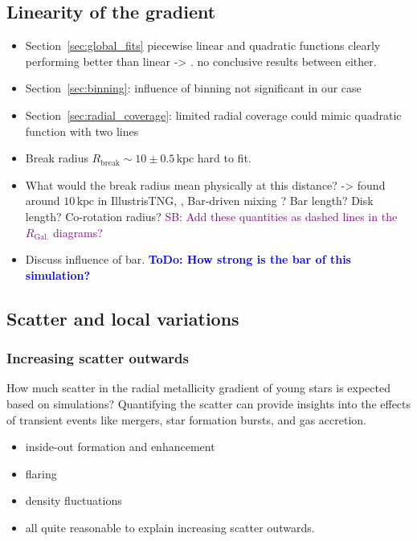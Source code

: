 \documentclass[fleqn,usenatbib]{mnras}
\newcommand{\ToDo}[1]{\textbf{\textcolor{blue}{ToDo: #1}}}
\newcommand{\SB}[1]{{\textcolor{purple}{SB: #1}}}
\begin{document}
\subsection{Linearity of the gradient} \label{sec:discussion_linearity}

\begin{itemize}
    \item Section~\ref{sec:global_fits} piecewise linear and quadratic functions clearly performing better than linear -> \citet{Donor2020, Myers2022}. no conclusive results between either.
    \item Section~\ref{sec:binning}: influence of binning not significant in our case
    \item Section~\ref{sec:radial_coverage}: limited radial coverage could mimic quadratic function with two lines
    \item Break radius $R_\mathrm{break} \sim 10 \pm 0.5\,\mathrm{kpc}$ hard to fit.
    \item What would the break radius mean physically at this distance? -> \citet{Garcia2023} found around $10\,\mathrm{kpc}$ in IllustrisTNG, \citet{Grand2016, Chen2023}, Bar-driven mixing \citep[see their Figs. 5-8][]{DiMatteo2013}? Bar length? Disk length? Co-rotation radius? \SB{Add these quantities as dashed lines in the $R_\mathrm{Gal.}$ diagrams?}
    \item Discuss influence of bar. \ToDo{How strong is the bar of this simulation?}
\end{itemize}

\subsection{Scatter and local variations} \label{sec:discussion_scatter}

\subsubsection{Increasing scatter outwards}

How much scatter in the radial metallicity gradient of young stars is expected based on simulations? Quantifying the scatter can provide insights into the effects of transient events like mergers, star formation bursts, and gas accretion.

\begin{itemize}
    \item inside-out formation and enhancement
    \item flaring
    \item density fluctuations
    \item all quite reasonable to explain increasing scatter outwards.
\end{itemize}
\end{document}
